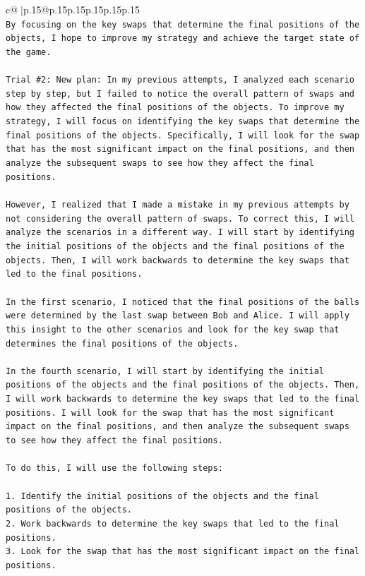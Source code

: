 \documentclass{article}
\begin{document}
{\begin{supertabular}{c@{$\;$}|p{.15\linewidth}@{}p{.15\linewidth}p{.15\linewidth}p{.15\linewidth}p{.15\linewidth}p{.15\linewidth}}
{{{\\ 
\texttt{By focusing on the key swaps that determine the final positions of the objects, I hope to improve my strategy and achieve the target state of the game.} \\
\\ 
\texttt{Trial \#2: New plan: In my previous attempts, I analyzed each scenario step by step, but I failed to notice the overall pattern of swaps and how they affected the final positions of the objects. To improve my strategy, I will focus on identifying the key swaps that determine the final positions of the objects. Specifically, I will look for the swap that has the most significant impact on the final positions, and then analyze the subsequent swaps to see how they affect the final positions.} \\
\\ 
\texttt{However, I realized that I made a mistake in my previous attempts by not considering the overall pattern of swaps. To correct this, I will analyze the scenarios in a different way. I will start by identifying the initial positions of the objects and the final positions of the objects. Then, I will work backwards to determine the key swaps that led to the final positions.} \\
\\ 
\texttt{In the first scenario, I noticed that the final positions of the balls were determined by the last swap between Bob and Alice. I will apply this insight to the other scenarios and look for the key swap that determines the final positions of the objects.} \\
\\ 
\texttt{In the fourth scenario, I will start by identifying the initial positions of the objects and the final positions of the objects. Then, I will work backwards to determine the key swaps that led to the final positions. I will look for the swap that has the most significant impact on the final positions, and then analyze the subsequent swaps to see how they affect the final positions.} \\
\\ 
\texttt{To do this, I will use the following steps:} \\
\\ 
\texttt{1. Identify the initial positions of the objects and the final positions of the objects.} \\
\texttt{2. Work backwards to determine the key swaps that led to the final positions.} \\
\texttt{3. Look for the swap that has the most significant impact on the final positions.} \\
}}}
\end{supertabular}}
\end{document}
